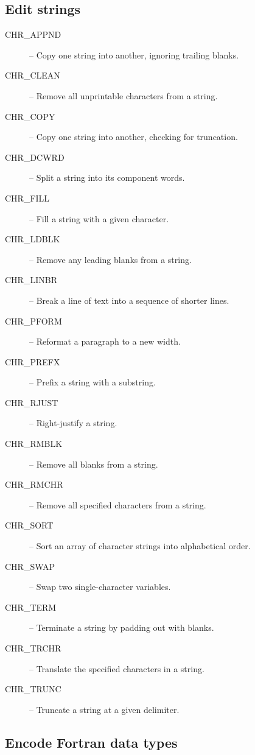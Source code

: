 \documentclass[twoside,11pt,nolof]{starlink}
\begin{document}
\subsection {Edit strings}

\begin {description}
\item [CHR\_APPND] -- Copy one string into another, ignoring trailing blanks.
\item [CHR\_CLEAN] -- Remove all unprintable characters from a string.
\item [CHR\_COPY] -- Copy one string into another, checking for truncation.
\item [CHR\_DCWRD] -- Split a string into its component words.
\item [CHR\_FILL] -- Fill a string with a given character.
\item [CHR\_LDBLK] -- Remove any leading blanks from a string.
\item [CHR\_LINBR] -- Break a line of text into a sequence of shorter lines.
\item [CHR\_PFORM] -- Reformat a paragraph to a new width.
\item [CHR\_PREFX] -- Prefix a string with a substring.
\item [CHR\_RJUST] -- Right-justify a string.
\item [CHR\_RMBLK] -- Remove all blanks from a string.
\item [CHR\_RMCHR] -- Remove all specified characters from a string.
\item [CHR\_SORT] -- Sort an array of character strings into alphabetical order.
\item [CHR\_SWAP] -- Swap two single-character variables.
\item [CHR\_TERM] -- Terminate a string by padding out with blanks.
\item [CHR\_TRCHR] -- Translate the specified characters in a string.
\item [CHR\_TRUNC] -- Truncate a string at a given delimiter.
\end {description}


\subsection {Encode Fortran data types}
\end{document}
